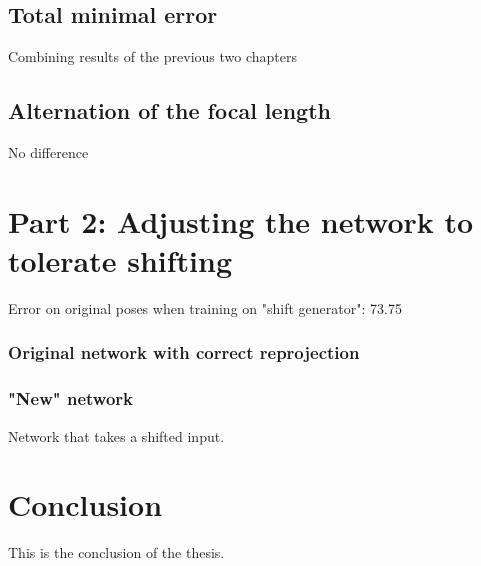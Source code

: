 \documentclass[11pt]{article}
\begin{document}
		
	\subsection{Total minimal error}
	
	Combining results of the previous two chapters
	
	\subsection{Alternation of the focal length}
	No difference
	
	
	\section{Part 2: Adjusting the network to tolerate shifting}
	\label{sec:network-adjusting}
	Error on original poses when training on "shift generator": 73.75
	\subsubsection{Original network with correct reprojection}
	
	\subsubsection{"New" network}
	Network that takes a shifted input.
	
	\section{Conclusion}
	This is the conclusion of the thesis.
	\newpage
	
	
	
\end{document}
